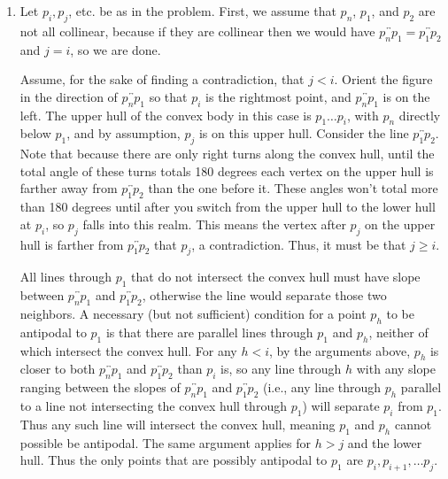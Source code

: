 \documentclass{article}
\newcommand{\oline}[1]{\overleftrightarrow{#1}}
\begin{document}
{\begin{enumerate}[label=(\alph*)]

    \item 

    Let $p_i,p_j$, etc. be as in the problem. First, we assume that $p_n$, $p_1$, and $p_2$ are not all collinear, because if they are collinear then we would have $\oline{p_np_1} = \oline{p_1p_2}$ and $j=i$, so we are done. 
    
    \vspace{3mm}
    Assume, for the sake of finding a contradiction, that $j < i$. Orient
    the figure in the direction of $\oline{p_np_1}$ so that
    $p_i$ is the rightmost point, and $\oline{p_np_1}$ is on the left.
    The upper hull of the convex body in this case is
    $p_1 \ldots p_i$, with $p_n$ directly below $p_1$, and by assumption, $p_j$ is on this upper hull. Consider the line $\oline{p_1p_2}$. Note that because there are only right turns along the convex hull, until the total angle of these turns totals 180 degrees each vertex on the upper hull is farther away from $\oline{p_1p_2}$ than the one before it. These angles won't total more than 180 degrees until after you switch from the upper hull to the lower hull at $p_i$, so $p_j$ falls into this realm. This means the vertex after $p_j$ on the upper hull  is farther from $\oline{p_1p_2}$ that $p_j$, a contradiction. Thus, it must be that $j \geq i$. 

    \vspace{3mm}
    All lines through $p_1$ that do not intersect the convex hull must have slope between $\oline{p_np_1}$ and $\oline{p_1p_2}$, otherwise the line would separate those two neighbors. A necessary (but not sufficient) condition for a point $p_h$ to be antipodal to $p_1$ is that there are parallel lines through $p_1$ and $p_h$, neither of which intersect the convex hull.  For any $h < i$, by the arguments above, $p_h$ is closer to both $\oline{p_np_1}$ and $\oline{p_1p_2}$ than $p_i$ is, so any line through $h$ with any slope ranging between the slopes of $\oline{p_np_1}$ and $\oline{p_1p_2}$ (i.e., any line through $p_h$ parallel to a line not intersecting the convex hull through $p_1$) will separate $p_i$ from $p_1$. Thus any such line will intersect the convex hull, meaning $p_1$ and $p_h$ cannot possible be antipodal.  The same argument applies for $h > j$ and the lower hull. Thus the only points that are possibly antipodal to $p_1$ are $p_i, p_{i+1}, \ldots p_j$.


\end{enumerate}}
\end{document}
